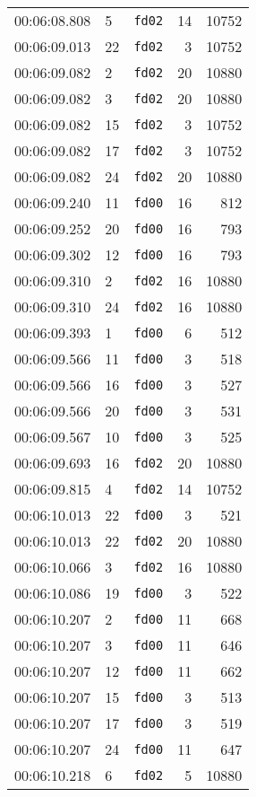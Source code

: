 \documentclass{article}
\begin{document}
\begin{longtable}{lllrr}
00:06:08.808 & 5 & \texttt{fd02} & 14 & 10752 \\
00:06:09.013 & 22 & \texttt{fd02} & 3 & 10752 \\
00:06:09.082 & 2 & \texttt{fd02} & 20 & 10880 \\
00:06:09.082 & 3 & \texttt{fd02} & 20 & 10880 \\
00:06:09.082 & 15 & \texttt{fd02} & 3 & 10752 \\
00:06:09.082 & 17 & \texttt{fd02} & 3 & 10752 \\
00:06:09.082 & 24 & \texttt{fd02} & 20 & 10880 \\
00:06:09.240 & 11 & \texttt{fd00} & 16 & 812 \\
00:06:09.252 & 20 & \texttt{fd00} & 16 & 793 \\
00:06:09.302 & 12 & \texttt{fd00} & 16 & 793 \\
00:06:09.310 & 2 & \texttt{fd02} & 16 & 10880 \\
00:06:09.310 & 24 & \texttt{fd02} & 16 & 10880 \\
00:06:09.393 & 1 & \texttt{fd00} & 6 & 512 \\
00:06:09.566 & 11 & \texttt{fd00} & 3 & 518 \\
00:06:09.566 & 16 & \texttt{fd00} & 3 & 527 \\
00:06:09.566 & 20 & \texttt{fd00} & 3 & 531 \\
00:06:09.567 & 10 & \texttt{fd00} & 3 & 525 \\
00:06:09.693 & 16 & \texttt{fd02} & 20 & 10880 \\
00:06:09.815 & 4 & \texttt{fd02} & 14 & 10752 \\
00:06:10.013 & 22 & \texttt{fd00} & 3 & 521 \\
00:06:10.013 & 22 & \texttt{fd02} & 20 & 10880 \\
00:06:10.066 & 3 & \texttt{fd02} & 16 & 10880 \\
00:06:10.086 & 19 & \texttt{fd00} & 3 & 522 \\
00:06:10.207 & 2 & \texttt{fd00} & 11 & 668 \\
00:06:10.207 & 3 & \texttt{fd00} & 11 & 646 \\
00:06:10.207 & 12 & \texttt{fd00} & 11 & 662 \\
00:06:10.207 & 15 & \texttt{fd00} & 3 & 513 \\
00:06:10.207 & 17 & \texttt{fd00} & 3 & 519 \\
00:06:10.207 & 24 & \texttt{fd00} & 11 & 647 \\
00:06:10.218 & 6 & \texttt{fd02} & 5 & 10880 \\

\end{longtable}
\end{document}
